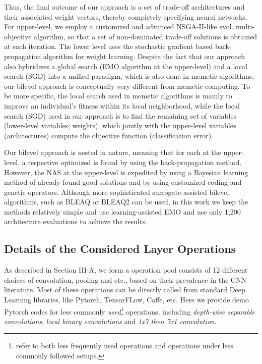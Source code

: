 \documentclass[journal]{IEEEtran}
\theoremstyle{definition}
\theoremstyle{remark}
\begin{document}
Thus, the final outcome of our approach is a set of trade-off architectures and their associated weight vectors, thereby completely specifying neural networks. For upper-level, we employ a customized and advanced NSGA-II-like evol. multi-objective algorithm, so that a set of non-dominated trade-off solutions is obtained at each iteration. The lower level uses the stochastic gradient based back-propagation algorithm for weight learning. {Despite the fact that our approach also hybridizes a global search (EMO algorithm at the upper-level) and a local search (SGD) into a unified paradigm, which is also done in memetic algorithms, our bilevel approach is conceptually very different from memetic computing. To be more specific, the local search used in memetic algorithms is mainly to improve an individual's fitness within its local neighborhood, while the local search (SGD) used in our approach is to find the remaining set of variables (lower-level variables; weights), which jointly with the upper-level variables (architectures) compute the objective function (classification error).}

Our bilevel approach is nested in nature, meaning that for each  at the upper-level, a respective optimized  is found by using the back-propagation method. However, the NAS at the upper-level is expedited by using a Bayesian learning method of already found good solutions and by using customized coding and genetic operators. Although more sophisticated surrogate-assisted bilevel algorithms, such as BLEAQ or BLEAQ2  \cite{bilevel-cma,bleaq} can be used, in this work we keep the methods relatively simple and use learning-assisted EMO and use only 1,200 architecture evaluations to achieve the results. 


\subsection{Details of the Considered Layer Operations\label{sec:operation_detail}}
As described in Section III-A, we form a operation pool consists of 12 different choices of convolution, pooling and etc., based on their prevalence in the CNN literature. Most of these operations can be directly called from standard Deep Learning libraries, like Pytorch, TensorFLow, Caffe, etc. Here we provide demo Pytorch codes for less commonly \emph{used}\footnote{refer to both less frequently used operations and operations under less commonly followed setups.} operations, including \emph{depth-wise separable convolutions}, \emph{local binary convolutions} and \emph{1{\rm x}7 then 7{\rm x}1 convolution}.
\end{document}
